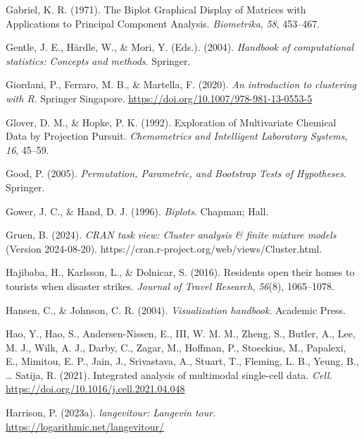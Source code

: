 \documentclass[
  letterpaper,
]{krantz}
\newlength{\cslhangindent}
\newenvironment{CSLReferences}[2] %
 {\begin{list}{}{%
  \setlength{\itemindent}{0pt}
  \setlength{\leftmargin}{0pt}
  \setlength{\parsep}{0pt}
  \ifodd #1
   \setlength{\leftmargin}{\cslhangindent}
   \setlength{\itemindent}{-1\cslhangindent}
  \fi
  \setlength{\itemsep}{#2\baselineskip}}}
 {\end{list}}
\begin{document}
\begin{CSLReferences}{1}{0}
Gabriel, K. R. (1971). The {B}iplot {G}raphical {D}isplay of {M}atrices
with {A}pplications to {P}rincipal {C}omponent {A}nalysis.
\emph{Biometrika}, \emph{58}, 453--467.

Gentle, J. E., Härdle, W., \& Mori, Y. (Eds.). (2004). \emph{Handbook of
computational statistics: Concepts and methods}. Springer.

Giordani, P., Ferraro, M. B., \& Martella, F. (2020). \emph{An
introduction to clustering with {R}}. Springer Singapore.
\url{https://doi.org/10.1007/978-981-13-0553-5}

Glover, D. M., \& Hopke, P. K. (1992). {E}xploration of {M}ultivariate
{C}hemical {D}ata by {P}rojection {P}ursuit. \emph{Chemometrics and
Intelligent Laboratory Systems}, \emph{16}, 45--59.

Good, P. (2005). \emph{Permutation, {P}arametric, and {B}ootstrap
{T}ests of {H}ypotheses}. Springer.

Gower, J. C., \& Hand, D. J. (1996). \emph{Biplots}. Chapman; Hall.

Gruen, B. (2024). \emph{CRAN task view: Cluster analysis \& finite
mixture models} (Version 2024-08-20).
https://cran.r-project.org/web/views/Cluster.html.

Hajibaba, H., Karlsson, L., \& Dolnicar, S. (2016). Residents open their
homes to tourists when disaster strikes. \emph{Journal of Travel
Research}, \emph{56}(8), 1065--1078.

Hansen, C., \& Johnson, C. R. (2004). \emph{Visualization handbook}.
Academic Press.

Hao, Y., Hao, S., Andersen-Nissen, E., III, W. M. M., Zheng, S., Butler,
A., Lee, M. J., Wilk, A. J., Darby, C., Zagar, M., Hoffman, P.,
Stoeckius, M., Papalexi, E., Mimitou, E. P., Jain, J., Srivastava, A.,
Stuart, T., Fleming, L. B., Yeung, B., \ldots{} Satija, R. (2021).
Integrated analysis of multimodal single-cell data. \emph{Cell}.
\url{https://doi.org/10.1016/j.cell.2021.04.048}

Harrison, P. (2023a). \emph{{langevitour}: Langevin tour}.
\url{https://logarithmic.net/langevitour/}


\end{CSLReferences}
\end{document}
